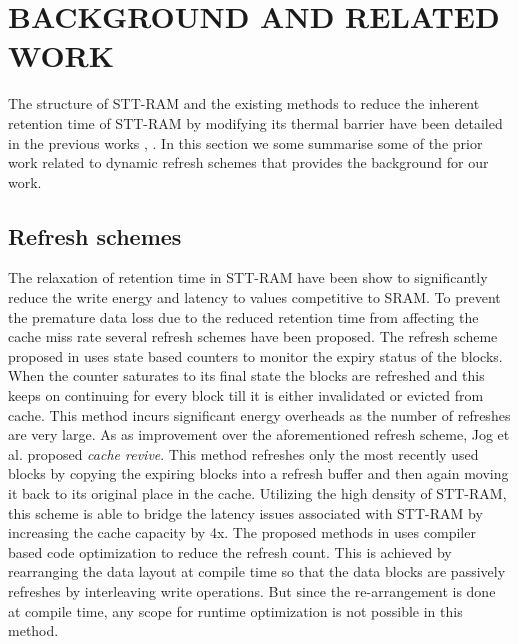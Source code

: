 \documentclass[sigconf]{acmart}
\begin{document}
\section{BACKGROUND AND RELATED WORK}

The structure of STT-RAM and the existing methods to reduce the inherent retention time of STT-RAM by modifying its thermal barrier have been detailed in the previous works \cite{cache_revive}, \cite{scaling_roadmap}. In this section we some summarise some of the prior work related to dynamic refresh schemes that provides the background for our work. 

\subsection{Refresh schemes}

The relaxation of retention time in STT-RAM have been show to significantly reduce the write energy and latency to values competitive to SRAM. To prevent the premature data loss due to the reduced retention time from affecting the cache miss rate several refresh schemes have been proposed. The refresh scheme proposed in \cite{sun} uses state based counters to monitor the expiry status of the blocks. When the counter saturates to its final state the blocks are refreshed and this keeps on continuing for every block till it is either invalidated or evicted from cache. This method incurs significant energy overheads as the number of refreshes are very large. As as improvement over the aforementioned refresh scheme, Jog et al. \cite{cache_revive} proposed \textit{cache revive}. This method refreshes only the most recently used blocks by copying the expiring blocks into a refresh buffer and then again moving it back to its original place in the cache. Utilizing the high density of STT-RAM, this scheme is able to bridge the latency issues associated with STT-RAM by increasing the cache capacity by 4x. The proposed methods in \cite{compiler} uses compiler based code optimization to reduce the refresh count. This is achieved by rearranging the data layout at compile time so that the data blocks are passively refreshes by interleaving write operations. But since the re-arrangement is done at compile time, any scope for runtime optimization is not possible in this method.
\end{document}
